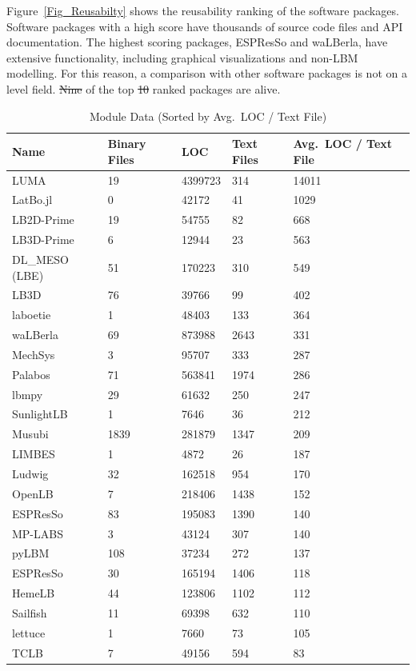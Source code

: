 \documentclass[final, 3p, times, authoryear]{elsarticle}
\newcommand{\esp}{ESPResSo\nolinebreak\hspace{-.05em}\raisebox{.4ex}{\small\bf
+}\nolinebreak\hspace{-.10em}\raisebox{.4ex}{\small\bf +}}
\providecommand{\DIFaddtex}[1]{{\protect\color{blue}\uwave{#1}}} %
\providecommand{\DIFdeltex}[1]{{\protect\color{red}\sout{#1}}}                      %
\providecommand{\DIFaddbegin}{} %
\providecommand{\DIFaddend}{} %
\providecommand{\DIFdelbegin}{} %
\providecommand{\DIFdelend}{} %
\providecommand{\DIFadd}[1]{\texorpdfstring{\DIFaddtex{#1}}{#1}} %
\providecommand{\DIFdel}[1]{\texorpdfstring{\DIFdeltex{#1}}{}} %
\begin{document}
Figure~\ref{Fig_Reusabilty} shows the reusability ranking of the software
packages. Software packages with a high score have thousands of source code
files and API documentation. The highest scoring packages, ESPResSo and
waLBerla, have extensive functionality, including graphical visualizations and
non-LBM modelling. For this reason, a comparison with other software packages is
not on a level field. \DIFdelbegin \DIFdel{Nine }\DIFdelend \DIFaddbegin \DIFadd{Seven }\DIFaddend of the top \DIFdelbegin \DIFdel{10 }\DIFdelend \DIFaddbegin \DIFadd{8 }\DIFaddend ranked packages are alive.

\begin{table}[ht!]
	\begin{center}
		\begin{tabular}{ p{3cm}p{2cm}p{2cm}p{2cm}p{3cm} }
			\toprule
			Name & Binary Files & LOC & Text Files & Avg.\ LOC / Text File \\
			\midrule
			LUMA & 19 & 4399723 & 314 & 14011 \\
			LatBo.jl & 0 & 42172 & 41& 1029 \\
			LB2D-Prime & 19 & 54755 & 82& 668 \\
			LB3D-Prime & 6 & 12944 & 23& 563 \\
			DL\_MESO (LBE) & 51 & 170223 & 310 & 549 \\
			LB3D & 76 & 39766 & 99 & 402 \\
			laboetie & 1 & 48403 & 133& 364 \\
			waLBerla & 69 & 873988 & 2643 & 331 \\
			MechSys & 3 & 95707 & 333 & 287 \\
			Palabos & 71 & 563841 & 1974 & 286 \\
			lbmpy & 29 & 61632 & 250 & 247 \\
			SunlightLB & 1 & 7646 & 36 & 212 \\
			Musubi & 1839 & 281879 & 1347 & 209 \\
			LIMBES & 1 & 4872 & 26 & 187 \\
			Ludwig & 32 & 162518 & 954 & 170 \\
			OpenLB & 7 & 218406 & 1438 & 152 \\
			ESPResSo & 83 & 195083 & 1390& 140 \\
			MP-LABS & 3 & 43124 & 307 & 140 \\
			pyLBM & 108 & 37234 & 272 & 137 \\
			\esp & 30 & 165194 & 1406& 118 \\
			HemeLB & 44 & 123806 & 1102& 112 \\
			Sailfish & 11 & 69398 & 632 & 110 \\
			lettuce & 1 & 7660 & 73 & 105 \\
			TCLB & 7 & 49156 & 594 & 83 \\
			\bottomrule
		\end{tabular}
		\caption{Module Data (Sorted by Avg.\ LOC / Text File)} \label{moduledata}
	\end{center}
\end{table}
\end{document}

